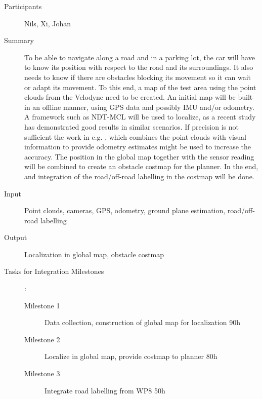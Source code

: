 \documentclass[11pt,a4paper]{article}
\begin{document}
\begin{description}
\item[Participants] Nils, Xi, Johan
\item[Summary] To be able to navigate along a road and in a parking lot, the car will have to know its 
			   position with respect to the road and its surroundings. It also needs to know if there
			   are obstacles blocking its movement so it can wait or adapt its movement.
			   To this end, a map of the test area using the point clouds from the
			   Velodyne need to be created. An initial map will be built in an offline manner, using GPS data and possibly
			   IMU and/or odometry. A framework such as NDT-MCL \cite{saarinen2013normal} 
			   will be used to localize, as a recent study \cite{magnusson2015beyond} has demonstrated good results
			   in similar scenarios. If precision is not sufficient the work in e.g. \cite{Zhang_DEMO},
			   which combines the point clouds with visual information to provide odometry estimates might be used to increase the accuracy.
			   The position in the global map together
			   with the sensor reading will be combined to create an obstacle costmap for the planner.
			   In the end, and integration of the road/off-road labelling in the costmap will be done.
				
\item[Input] Point clouds, cameras, GPS, odometry, ground plane estimation, road/off-road labelling
\item[Output] Localization in global map, obstacle costmap
\item[Tasks for Integration Milestones]:\
	\begin{description}
		\item[Milestone 1] Data collection, construction of global map for localization 90h
		\item[Milestone 2] Localize in global map, provide costmap to planner 80h
		\item[Milestone 3] Integrate road labelling from WP8 50h
	\end{description}	 
\end{description}
\end{document}
